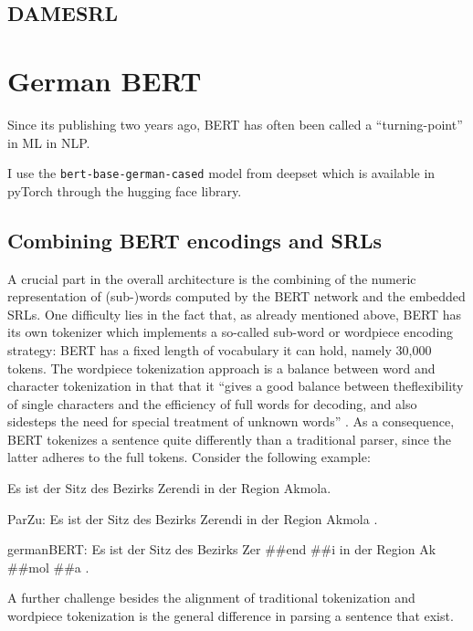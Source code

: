 \subsection{DAMESRL}

\section{German BERT}

Since its publishing two years ago, BERT \citep{devlin2018bert} has often been called a ``turning-point'' in ML in NLP.

I use the \texttt{bert-base-german-cased} model from deepset which is available in pyTorch through the hugging face library\cite{wolf2019transformers}.

\subsection{Combining BERT encodings and SRLs}

A crucial part in the overall architecture is the combining of the numeric representation of (sub-)words computed by the BERT network and the embedded SRLs.
One difficulty lies in the fact that, as already mentioned above, BERT has its own tokenizer which implements a so-called sub-word or wordpiece \cite{wu2016google} encoding strategy:
BERT has a fixed length of vocabulary it can hold, namely 30,000 tokens.
The wordpiece tokenization approach is a balance between word and character tokenization in that that it ``gives a good balance between theflexibility of single characters and the efficiency of full words for decoding, and also sidesteps the need for special treatment of unknown words'' \citep[p.~2]{wu2016google}.
As a consequence, BERT tokenizes a sentence quite differently than a traditional parser, since the latter adheres to the full tokens.
Consider the following example:

\begin{examples}
	\label{ex:tokenization-diff}
	\item Es ist der Sitz des Bezirks Zerendi in der Region Akmola.
	\item ParZu: Es ist der Sitz des Bezirks Zerendi in der Region Akmola .
	\item germanBERT: Es ist der Sitz des Bezirks Zer \#\#end \#\#i in der Region Ak \#\#mol \#\#a .
\end{examples}


A further challenge besides the alignment of traditional tokenization and wordpiece tokenization is the general difference in parsing a sentence that exist.



